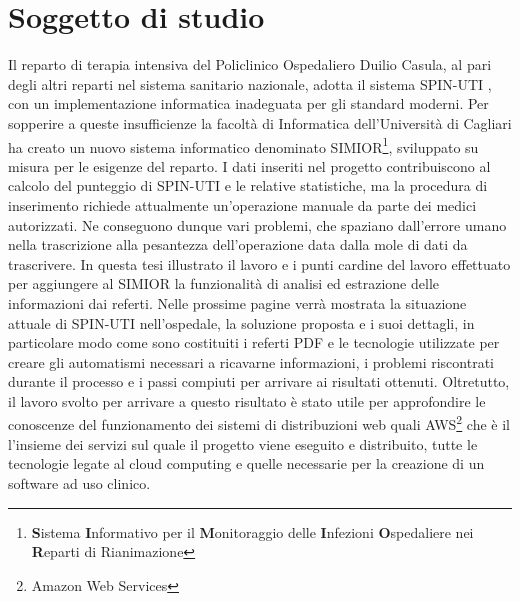 \section{Soggetto di studio}
Il reparto di terapia intensiva del Policlinico Ospedaliero Duilio Casula, al pari degli altri reparti nel sistema sanitario nazionale, adotta il sistema SPIN-UTI , con un 
implementazione informatica inadeguata per gli standard moderni. Per sopperire a queste insufficienze la facoltà di Informatica dell'Università di Cagliari ha creato un nuovo sistema informatico denominato SIMIOR\footnote{\textbf{S}istema \textbf{I}nformativo per il \textbf{M}onitoraggio delle \textbf{I}nfezioni \textbf{O}spedaliere nei \textbf{R}eparti di Rianimazione}, sviluppato su misura per le esigenze del reparto. I dati inseriti nel progetto contribuiscono al calcolo del punteggio di SPIN-UTI e le relative statistiche, ma la procedura di inserimento richiede attualmente un'operazione manuale da parte dei medici autorizzati. Ne conseguono dunque vari problemi, che spaziano dall'errore umano nella trascrizione alla pesantezza dell'operazione data dalla mole di dati da trascrivere.
In questa tesi illustrato il lavoro e i punti cardine del lavoro effettuato per aggiungere al SIMIOR la funzionalità di analisi ed estrazione delle informazioni dai referti. Nelle prossime pagine verrà mostrata la situazione attuale di SPIN-UTI nell'ospedale, la soluzione proposta e i suoi dettagli, in particolare modo come sono costituiti i referti PDF e le tecnologie utilizzate per creare gli automatismi necessari a ricavarne informazioni, i problemi riscontrati durante il processo e i passi compiuti per arrivare ai risultati ottenuti.
Oltretutto, il lavoro svolto per arrivare a questo risultato è stato utile per approfondire le conoscenze del funzionamento dei sistemi di distribuzioni web quali AWS\footnote{Amazon Web Services} che è il l'insieme dei servizi sul quale il progetto viene eseguito e distribuito, tutte le tecnologie legate al cloud computing e quelle necessarie per la creazione di un software ad uso clinico. 


